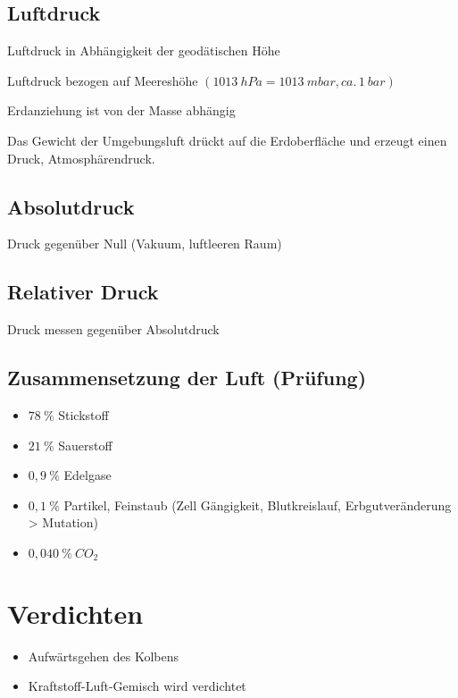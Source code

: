 \subsection{Luftdruck}\label{luftdruck}

Luftdruck in Abhängigkeit der geodätischen Höhe

Luftdruck bezogen auf Meereshöhe $(1013~hPa = 1013~mbar, ca.\,1~bar)$

Erdanziehung ist von der Masse abhängig

Das Gewicht der Umgebungsluft drückt auf die Erdoberfläche und erzeugt
einen Druck, Atmosphärendruck.

\subsection{Absolutdruck}\label{absolutdruck}

Druck gegenüber Null (Vakuum, luftleeren Raum)

\subsection{Relativer Druck}\label{relativer-druck}

Druck messen gegenüber Absolutdruck

\subsection{Zusammensetzung der Luft
(Prüfung)}\label{zusammensetzung-der-luft-pruefung}

\begin{itemize}
\item
  $78~\%$ Stickstoff
\item
  $21~\%$ Sauerstoff
\item
  $0,9~\%$ Edelgase
\item
  $0,1~\%$ Partikel, Feinstaub (Zell Gängigkeit, Blutkreislauf,
  Erbgutveränderung > Mutation)
\item
  $0,040~\% ~ CO_2$
\end{itemize}

\section{Verdichten}\label{verdichten}

\begin{itemize}
\item
  Aufwärtsgehen des Kolbens
\item
  Kraftstoff-Luft-Gemisch wird verdichtet
\end{itemize}

